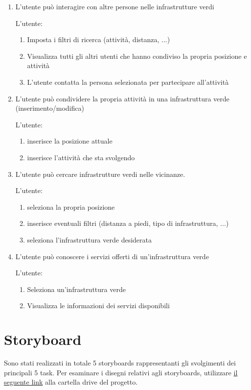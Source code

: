 \begin{enumerate}
    \item[3.] L’utente può interagire con altre persone nelle infrastrutture verdi
    
    L’utente:
    \begin{enumerate}
        \item Imposta i filtri di ricerca (attività, distanza, ...)
        \item Visualizza tutti gli altri utenti che hanno condiviso la propria posizione e attività
        \item L’utente contatta la persona selezionata per partecipare all’attività
    \end{enumerate}

    \item[3.1.] L’utente può condividere la propria attività in una infrastruttura verde (inserimento/modifica)
    
    L’utente:
    \begin{enumerate}
        \item inserisce la posizione attuale
        \item inserisce l’attività che sta svolgendo
    \end{enumerate}
    
    \item[4.] L’utente può cercare infrastrutture verdi nelle vicinanze.

    L’utente:
    \begin{enumerate}
        \item seleziona la propria posizione
        \item inserisce eventuali filtri (distanza a piedi, tipo di infrastruttura, ...)
        \item seleziona l’infrastruttura verde desiderata
    \end{enumerate}
    
    \item[5.] L’utente può conoscere i servizi offerti di un’infrastruttura verde

    L’utente:
    \begin{enumerate}
        \item Seleziona un’infrastruttura verde
        \item Visualizza le informazioni dei servizi disponibili
    \end{enumerate}
\end{enumerate}

\section{Storyboard}
Sono stati realizzati in totale 5 storyboards rappresentanti gli svolgimenti dei principali 5 task.
Per esaminare i disegni relativi agli storyboards, utilizzare \href{https://drive.google.com/drive/u/0/folders/13NUPKKbf_ISkTarvQYw04d_vPzp9hNU0}{il seguente link} alla cartella drive del progetto.